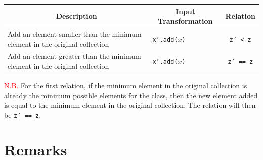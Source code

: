 \documentclass[12pt, a4paper]{article}
\begin{document}
\begin{table}[H]
  \centering
  \begin{tabular}{p{8cm}|l|c}
  \hline
  \multicolumn{1}{c|}{\textbf{Description}} & \multicolumn{1}{c|}{\textbf{Input Transformation}} &
  \textbf{Relation} \\ \hline
  Add an element smaller than the minimum element in the original collection & \texttt{x'.add($x$)}
  & \texttt{z' < z} \\ \hline
  Add an element greater than the minimum element in the original collection & \texttt{x'.add($x$)} &
  \texttt{z' == z} \\ \hline
  \hline
  \end{tabular}
\end{table}

\textcolor{red}{N.B.} For the first relation, if the minimum element in the original collection is
already the minimum possible elements for the class, then the new element added is equal to the
minimum element in the original collection. The relation will then be \texttt{z' == z}.

\section{Remarks}


\printbibliography
\end{document}
